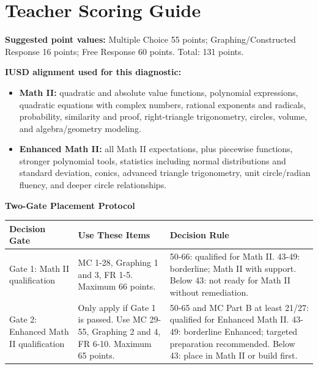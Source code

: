 \documentclass[11pt]{article}
\renewcommand{\arraystretch}{1.18}
\begin{document}
\newpage
\section*{Teacher Scoring Guide}
\begin{titlebox}
\textbf{Suggested point values:} Multiple Choice 55 points; Graphing/Constructed Response 16 points; Free Response 60 points. Total: 131 points.
\end{titlebox}

\begin{problemBox}
\textbf{IUSD alignment used for this diagnostic:}
\begin{itemize}
\item \textbf{Math II:} quadratic and absolute value functions, polynomial expressions, quadratic equations with complex numbers, rational exponents and radicals, probability, similarity and proof, right-triangle trigonometry, circles, volume, and algebra/geometry modeling.
\item \textbf{Enhanced Math II:} all Math II expectations, plus piecewise functions, stronger polynomial tools, statistics including normal distributions and standard deviation, conics, advanced triangle trigonometry, unit circle/radian fluency, and deeper circle relationships.
\end{itemize}
\end{problemBox}

\begin{sectionNote}
\textbf{Two-Gate Placement Protocol}
\end{sectionNote}
\begin{center}
\renewcommand{\arraystretch}{1.25}
\begin{tabular}{|L{3.0cm}|L{4.4cm}|L{6.2cm}|}
\hline
\textbf{Decision Gate} & \textbf{Use These Items} & \textbf{Decision Rule}\\
\hline
Gate 1: Math II qualification & MC 1-28, Graphing 1 and 3, FR 1-5. Maximum 66 points. & 
50-66: qualified for Math II. 43-49: borderline; Math II with support. Below 43: not ready for Math II without remediation.\\
\hline
Gate 2: Enhanced Math II qualification & Only apply if Gate 1 is passed. Use MC 29-55, Graphing 2 and 4, FR 6-10. Maximum 65 points. &
50-65 and MC Part B at least 21/27: qualified for Enhanced Math II. 43-49: borderline Enhanced; targeted preparation recommended. Below 43: place in Math II or build first.\\
\hline
\end{tabular}
\end{center}
\end{document}

